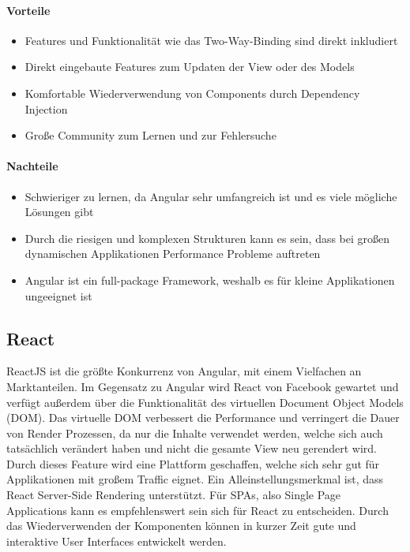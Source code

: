 \paragraph{Vorteile}
\begin{itemize}
    \item Features und Funktionalität wie das Two-Way-Binding sind direkt inkludiert
    \item Direkt eingebaute Features zum Updaten der View oder des Models
    \item Komfortable Wiederverwendung von Components durch Dependency Injection
    \item Große Community zum Lernen und zur Fehlersuche
\end{itemize}

\paragraph{Nachteile}
\begin{itemize}
    \item Schwieriger zu lernen, da Angular sehr umfangreich ist und es viele mögliche Lösungen gibt
    \item Durch die riesigen und komplexen Strukturen kann es sein, dass bei großen dynamischen Applikationen Performance Probleme auftreten
    \item Angular ist ein full-package Framework, weshalb es für kleine Applikationen ungeeignet ist
\end{itemize}

\subsection{React}
\label{subsec:react}
ReactJS ist die größte Konkurrenz von Angular, mit einem Vielfachen an Marktanteilen.
Im Gegensatz zu Angular wird React von Facebook gewartet und verfügt außerdem über die Funktionalität des virtuellen
Document Object Models (DOM).
Das virtuelle DOM verbessert die Performance und verringert die Dauer von Render Prozessen, da nur die Inhalte verwendet werden,
welche sich auch tatsächlich verändert haben und nicht die gesamte View neu gerendert wird.
Durch dieses Feature wird eine Plattform geschaffen, welche sich sehr gut für Applikationen mit großem Traffic eignet.
Ein Alleinstellungsmerkmal ist, dass React Server-Side Rendering unterstützt.
Für SPAs, also Single Page Applications kann es empfehlenswert sein sich für React zu entscheiden.
Durch das Wiederverwenden der Komponenten können in kurzer Zeit gute und interaktive User Interfaces entwickelt werden.

